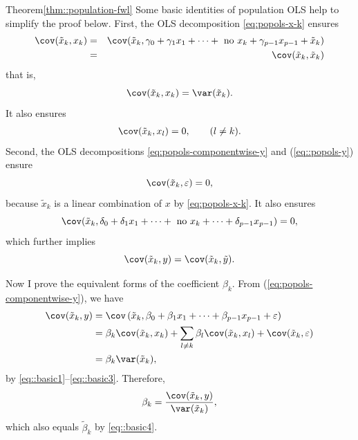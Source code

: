 \begin{myproof}{Theorem}{\ref{thm::population-fwl}}
Some basic identities of population OLS help to simplify the proof below. First, the OLS decomposition \eqref{eq:popols-x-k} ensures
\begin{eqnarray*}
\cov(\tilde{x}_{k},x_{k})
  &=& \cov(\tilde{x}_{k},  \gamma_0 +  \gamma_{1}x_{1}+\cdots+\text{ no }x_{k}+\gamma_{p-1}x_{p-1}+\tilde{x}_{k})  \\
  &=& \cov(\tilde{x}_{k},\tilde{x}_{k})
\end{eqnarray*}
that is,
 \begin{equation}
\cov(\tilde{x}_{k},x_{k}) =\var(\tilde{x}_{k}).  \label{eq::basic1}
 \end{equation}
It also ensures
\begin{eqnarray} \label{eq::basic2}
\cov(\tilde{x}_{k},x_{l}) = 0,\qquad(l\neq k).
\end{eqnarray}
Second, the OLS decompositions \eqref{eq:popols-componentwise-y} and (\ref{eq::popols-y}) ensure
\begin{equation}
\cov(\tilde{x}_{k},\varepsilon) = 0, \label{eq::basic3}
\end{equation}
because $\tilde{x}_{k}$ is a linear combination of $x$ by \eqref{eq:popols-x-k}.  It also ensures 
\[
\cov(\tilde{x}_{k}, \delta_0 +  \delta_{1}x_{1}+\cdots+\text{ no }x_{k}  + \cdots  +\delta_{p-1}x_{p-1})=0,
\]
which further implies
\begin{equation}
\cov(\tilde{x}_{k},y)=\cov(\tilde{x}_{k},\tilde{y}) . \label{eq::basic4}
\end{equation}

 


Now I prove the equivalent forms of the coefficient $\beta_{k}$. 
From (\ref{eq:popols-componentwise-y}), we have 
\begin{align*}
\cov(\tilde{x}_{k},y) & =\cov\left(\tilde{x}_{k}, \beta_0 +  \beta_{1}x_{1}+\cdots+\beta_{p-1}x_{p-1}+\varepsilon\right)\\
 & =\beta_{k} \cov(\tilde{x}_{k},x_{k}) +\sum_{l\neq k}\beta_{l} \cov(\tilde{x}_{k},x_{l}) +\cov(\tilde{x}_{k},\varepsilon) \\
 &= \beta_{k} \var(\tilde{x}_{k}),
\end{align*}
by \eqref{eq::basic1}--\eqref{eq::basic3}. 
Therefore, 
\[
\beta_{k}=\frac{\cov(\tilde{x}_{k},y)}{\var(\tilde{x}_{k})} ,
\]
which also equals $\tilde{\beta}_k$ by \eqref{eq::basic4}. 



\end{myproof}
